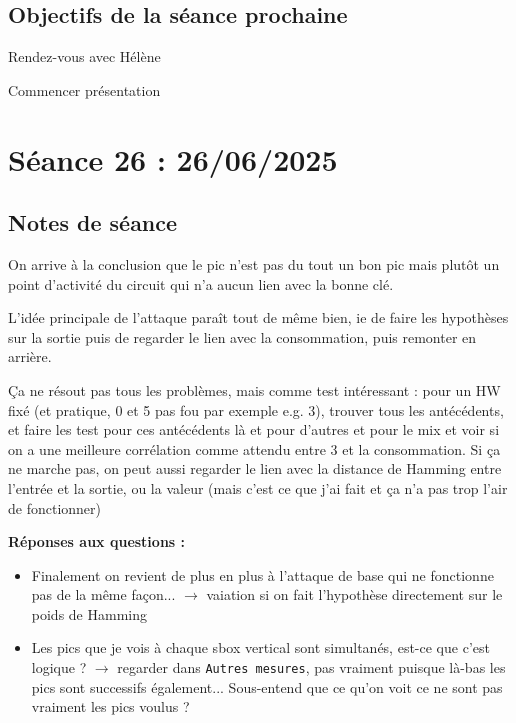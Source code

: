\documentclass[12pt]{article}
\newcommand{\cmark}{\ding{51}}%
\newcommand{\done}{\rlap{$\square$}{\raisebox{2pt}{\large\hspace{1pt}\cmark}}%
	\hspace{-2.5pt}}
\begin{document}
	\subsection{Objectifs de la séance prochaine}
	\begin{todolist}
		\item Rendez-vous avec Hélène
		\item[\done] Commencer présentation
	\end{todolist}
	
	
	\section{Séance 26 : 26/06/2025}
	\subsection{Notes de séance}
	On arrive à la conclusion que le pic n'est pas du tout un bon pic mais plutôt un point d'activité du circuit qui n'a aucun lien avec la bonne clé.
	
	L'idée principale de l'attaque paraît tout de même bien, ie de faire les hypothèses sur la sortie puis de regarder le lien avec la consommation, puis remonter en arrière.
	
	\c{C}a ne résout pas tous les problèmes, mais comme test intéressant : pour un HW fixé (et pratique, 0 et 5 pas fou par exemple e.g. 3), trouver tous les antécédents, et faire les test pour ces antécédents là et pour d'autres et pour le mix et voir si on a une meilleure corrélation comme attendu entre 3 et la consommation. Si ça ne marche pas, on peut aussi regarder le lien avec la distance de Hamming entre l'entrée et la sortie, ou la valeur (mais c'est ce que j'ai fait et ça n'a pas trop l'air de fonctionner)
	
	\textbf{Réponses aux questions :}
	\begin{itemize}
		\item Finalement on revient de plus en plus à l'attaque de base qui ne fonctionne pas de la même façon... $\rightarrow$ vaiation si on fait l'hypothèse directement sur le poids de Hamming
		\item Les pics que je vois à chaque sbox vertical sont simultanés, est-ce que c'est logique ? $\rightarrow$ regarder dans \verb|Autres mesures|, pas vraiment puisque là-bas les pics sont successifs également... Sous-entend que ce qu'on voit ce ne sont pas vraiment les pics voulus ?
	\end{itemize}
	
\end{document}

